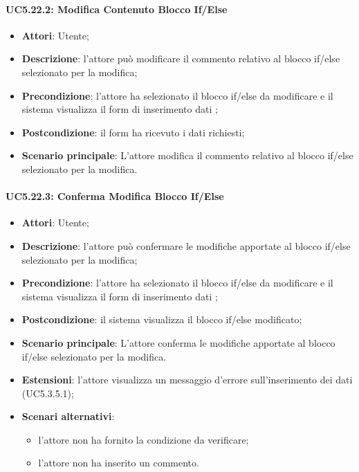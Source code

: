 \paragraph{UC5.22.2: Modifica Contenuto Blocco If/Else}
\label{UC5.22.2}
\begin{itemize}
\item \textbf{Attori}: Utente;
	\item \textbf{Descrizione}: l'attore può modificare il commento relativo al blocco if/else selezionato per la modifica;
	\item \textbf{Precondizione}: l'attore ha selezionato il blocco if/else da modificare e il sistema visualizza il form di inserimento dati ;
	\item \textbf{Postcondizione}: il form ha ricevuto i dati richiesti;
	\item \textbf{Scenario principale}: L'attore modifica il commento relativo al blocco if/else selezionato per la modifica.
\end{itemize}

\paragraph{UC5.22.3: Conferma Modifica Blocco If/Else}
\label{UC5.22.3}
\begin{itemize}
	\item \textbf{Attori}: Utente;
	\item \textbf{Descrizione}: l'attore può confermare le modifiche apportate al blocco if/else selezionato per la modifica;
	\item \textbf{Precondizione}: l'attore ha selezionato il blocco if/else da modificare e il sistema visualizza il form di inserimento dati ;
	\item \textbf{Postcondizione}: il sistema visualizza il blocco if/else modificato;
	\item \textbf{Scenario principale}: L'attore conferma le modifiche apportate al blocco if/else selezionato per la modifica.
	\item \textbf{Estensioni}: l'attore visualizza un messaggio d'errore sull'inserimento dei dati (UC5.3.5.1);
	\item \textbf{Scenari alternativi}:
	\begin{itemize}
		\item l'attore non ha fornito la condizione da verificare;
		\item l'attore non ha inserito un commento.
	\end{itemize}
\end{itemize}

